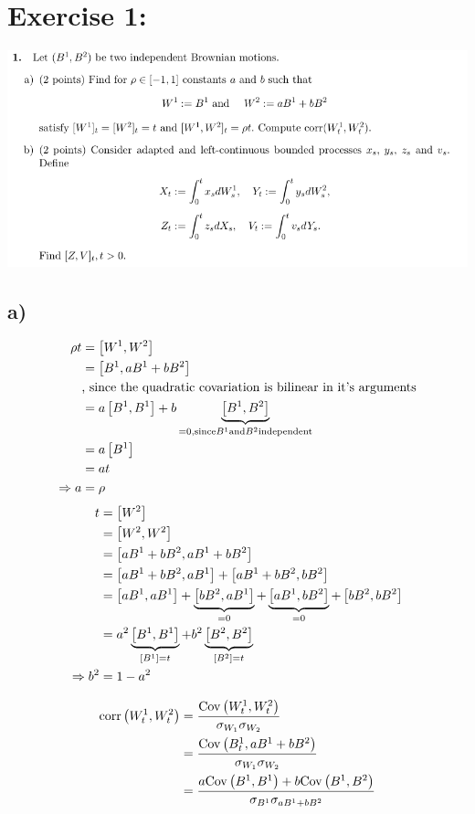 \documentclass[document.tex]{subfiles}
\begin{document}
\section*{Exercise 1:}

\includegraphics[width=\textwidth]{ex1.png}

\subsection*{a)}
\begin{align*}
	\rho t &= \left[W^1 , W^2 \right] \\
	&= \left[B^1 , a B^1 + b B^2 \right] \\
	&\text{, since the quadratic covariation is bilinear in it's arguments}\\
	&= a \left[B^1 , B^1 \right] + b \underbrace{\left[B^1 , B^2 \right]}_{=0, \text{since} B^1 \text{and} B^2 \text{independent}} \\
	&= a \left[ B^1 \right] \\
	&= a t \\
\Rightarrow a &= \rho	 
\end{align*}
\begin{align*}
	t &= \left[ W^2 \right] \\
	&= \left[W^2 , W^2 \right]\\
	&= \left[a B^1 + b B^2 , a B^1 + b B^2 \right]\\
	&= \left[a B^1 + b B^2 , a B^1 \right] + \left[a B^1 + b B^2 , b B^2 \right]\\
	&= \left[aB^1 , aB^1 \right] + \underbrace{\left[bB^2 , aB^1 \right]}_{=0} + \underbrace{\left[aB^1 , bB^2 \right]}_{=0} + \left[bB^2 , bB^2 \right]\\
	&= a^2 \underbrace{\left[B^1 , B^1 \right]}_{\left[ B^1 \right]=t}+ b^2 \underbrace{\left[B^2 , B^2 \right]}_{\left[ B^2 \right]=t} \\
\Rightarrow	b^2 &= 1 - a^2
\end{align*}

\begin{align*}
	\mathrm{corr}\left(W^1_t , W^2_t\right) &= \frac{\mathrm{Cov}\left(W^1_t , W^2_t\right)}{\sigma_{W_1}\sigma_{W_2}}\\ 
	&= \frac{\mathrm{Cov}\left(B^1_t , aB^1 + b B^2\right)}{\sigma_{W_1}\sigma_{W_2}}\\
	&= \frac{a \mathrm{Cov}\left(B^1 , B^1\right) + b\mathrm{Cov}\left(B^1 , B^2\right)}{\sigma_{B^1} \sigma_{a B^1 + b B^2}}
\end{align*}
\end{document}
